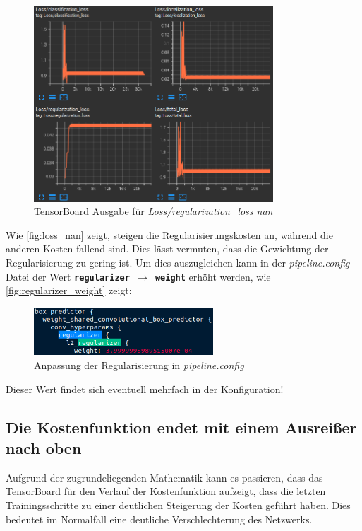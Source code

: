 \documentclass[12pt, oneside]{article}
\begin{document}
\begin{figure}[ht]
	\centering
	\includegraphics[width = 0.8\textwidth]{Bilder/misc/loss nan.png}
	\caption{TensorBoard Ausgabe für \textit{Loss/regularization\_loss nan}}
	\label{fig:loss_nan}
\end{figure}
Wie \autoref{fig:loss_nan} zeigt, steigen die Regularisierungskosten an, während die anderen Kosten fallend sind. Dies lässt vermuten, dass die Gewichtung der Regularisierung zu gering ist. Um dies auszugleichen kann in der \textit{pipeline.config}-Datei der Wert \textbf{\texttt{regularizer $\rightarrow$ weight}} erhöht werden, wie \autoref{fig:regularizer_weight} zeigt:

\begin{figure}[htbp]
	\centering
	\includegraphics[width = 0.6\textwidth]{Bilder/misc/regularizer_weight.png}
	\caption{Anpassung der Regularisierung in \textit{pipeline.config}}
	\label{fig:regularizer_weight}
\end{figure}
Dieser Wert findet sich eventuell mehrfach in der Konfiguration!

\subsection{Die Kostenfunktion endet mit einem Ausreißer nach oben}

Aufgrund der zugrundeliegenden Mathematik kann es passieren, dass das TensorBoard für den Verlauf der Kostenfunktion aufzeigt, dass die letzten Trainingsschritte zu einer deutlichen Steigerung der Kosten geführt haben. Dies bedeutet im Normalfall eine deutliche Verschlechterung des Netzwerks.
\end{document}
